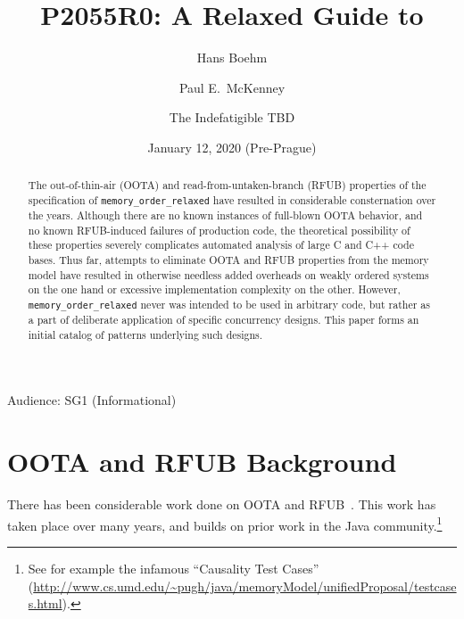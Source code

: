 \documentclass[10]{article}
\begin{document}
\title{P2055R0: A Relaxed Guide to }

\newcommand{\co}[1]{\lstinline[breaklines=yes,breakatwhitespace=yes]{#1}}

\author{
Hans Boehm\\ \and
Paul E.~McKenney\\ \and
The Indefatigible TBD
}
\date{January 12, 2020 (Pre-Prague)}
\maketitle{}

Audience: SG1 (Informational)

\begin{abstract}
	The out-of-thin-air (OOTA) and read-from-untaken-branch (RFUB)
	properties of the specification of \co{memory_order_relaxed}
	have resulted in considerable consternation over the years.
	Although there are no known instances of full-blown OOTA
	behavior, and no known RFUB-induced failures of production code,
	the theoretical possibility of these properties severely
	complicates automated analysis of large C and C++ code bases.
	Thus far, attempts to eliminate OOTA and RFUB properties from
	the memory model have resulted in otherwise needless added
	overheads on weakly ordered systems on the one hand or
	excessive implementation complexity on the other.
	However, \co{memory_order_relaxed} never was intended to be used
	in arbitrary code, but rather as a part of deliberate application
	of specific concurrency designs.
	This paper forms an initial catalog of patterns underlying such
	designs.
\end{abstract}

\section{OOTA and RFUB Background}
\label{sec:OOTA and RFUB Background}

There has been considerable work done on OOTA and
RFUB~\cite{Boehm:2014:OGA:2618128.2618134,PaulEMcKenney2016OOTA,Lahav:2017:RSC:3062341.3062352,Sinclair:2017:CAR:3079856.3080206,HansBoehm2019OOTArevisitedAgain,MarkBatty2019ModularRelaxedDependenciesOOTA}.
This work has taken place over many years, and builds on prior work
in the Java community.\footnote{
	See for example the infamous ``Causality Test Cases''
	(\url{http://www.cs.umd.edu/~pugh/java/memoryModel/unifiedProposal/testcases.html}).}
\end{document}
